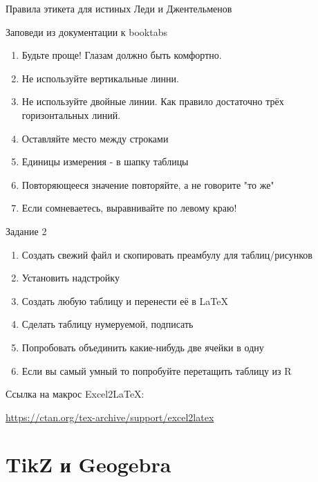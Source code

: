 \documentclass[aspectratio=169]{beamer} %
\begin{document}
\begin{frame}{Правила этикета для истиных Леди и Джентельменов} 
\begin{block}{Заповеди из документации к booktabs}
\begin{enumerate}
\item Будьте проще! Глазам должно быть комфортно.
\item Не используйте вертикальные линни.
\item Не используйте двойные линии. Как правило достаточно трёх горизонтальных линий.
\item Оставляйте место между строками
\item Единицы измерения - в шапку таблицы
\item Повторяющееся значение повторяйте, а не говорите "то же"
\item Если сомневаетесь, выравнивайте по левому краю!
\end{enumerate}
\end{block}
\end{frame}


\begin{frame}[plain]{Задание 2} 

\begin{enumerate}
	\item  Создать свежий файл и скопировать преамбулу для таблиц/рисунков
	\item  Установить надстройку
	\item  Создать любую таблицу и перенести её в \LaTeX
	\item  Сделать таблицу нумеруемой, подписать
	\item  Попробовать объединить какие-нибудь две ячейки в одну
	\item  Если вы самый умный то попробуйте перетащить таблицу из R 
\end{enumerate}

\begin{block}{Ссылка на макрос Excel2LaTeX:}
	\vspace{3mm}
	\centerline {\url{https://ctan.org/tex-archive/support/excel2latex}}
	\vspace{3mm}
\end{block}
\end{frame}


\section{TikZ и Geogebra} 
\end{document}
